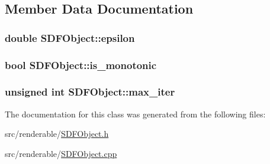 \subsection{Member Data Documentation}
\subsubsection[{\texorpdfstring{epsilon}{epsilon}}]{\setlength{\rightskip}{0pt plus 5cm}double S\+D\+F\+Object\+::epsilon\hspace{0.3cm}{\ttfamily [private]}}\hypertarget{classSDFObject_a5bcc7f77148687f9545f0ade0db6c7f0}{}\label{classSDFObject_a5bcc7f77148687f9545f0ade0db6c7f0}
\subsubsection[{\texorpdfstring{is\+\_\+monotonic}{is_monotonic}}]{\setlength{\rightskip}{0pt plus 5cm}bool S\+D\+F\+Object\+::is\+\_\+monotonic\hspace{0.3cm}{\ttfamily [private]}}\hypertarget{classSDFObject_af366e048b8af77961de4a1c5a45dc110}{}\label{classSDFObject_af366e048b8af77961de4a1c5a45dc110}
\subsubsection[{\texorpdfstring{max\+\_\+iter}{max_iter}}]{\setlength{\rightskip}{0pt plus 5cm}unsigned int S\+D\+F\+Object\+::max\+\_\+iter\hspace{0.3cm}{\ttfamily [private]}}\hypertarget{classSDFObject_aff2946d73110ace629e66f9eac2c13aa}{}\label{classSDFObject_aff2946d73110ace629e66f9eac2c13aa}


The documentation for this class was generated from the following files\+:\begin{DoxyCompactItemize}
\item 
src/renderable/\hyperlink{SDFObject_8h}{S\+D\+F\+Object.\+h}\item 
src/renderable/\hyperlink{SDFObject_8cpp}{S\+D\+F\+Object.\+cpp}\end{DoxyCompactItemize}
